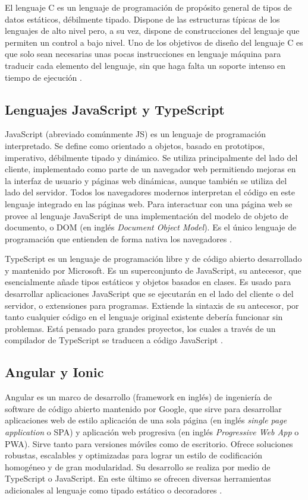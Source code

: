 El lenguaje C es un lenguaje de programación de propósito general de tipos de datos estáticos, débilmente tipado. Dispone de las estructuras típicas de los lenguajes de alto nivel pero, a su vez, dispone de construcciones del lenguaje que permiten un control a bajo nivel. Uno de los objetivos de diseño del lenguaje C es que solo sean necesarias unas pocas instrucciones en lenguaje máquina para traducir cada elemento del lenguaje, sin que haga falta un soporte intenso en tiempo de ejecución \citep{22}.

\subsection{Lenguajes JavaScript y TypeScript}

JavaScript (abreviado comúnmente JS) es un lenguaje de programación interpretado. Se define como orientado a objetos, basado en prototipos, imperativo, débilmente tipado y dinámico. Se utiliza principalmente del lado del cliente, implementado como parte de un navegador web permitiendo mejoras en la interfaz de usuario y páginas web dinámicas, aunque también se utiliza del lado del servidor. Todos los navegadores modernos interpretan el código en este lenguaje integrado en las páginas web. Para interactuar con una página web se provee al lenguaje JavaScript de una implementación del modelo de objeto de documento, o DOM (en inglés \textit{Document Object Model}). Es el único lenguaje de programación que entienden de forma nativa los navegadores \citep{23}.

TypeScript es un lenguaje de programación libre y de código abierto desarrollado y mantenido por Microsoft. Es un superconjunto de JavaScript, su antecesor, que esencialmente añade tipos estáticos y objetos basados en clases. Es usado para desarrollar aplicaciones JavaScript que se ejecutarán en el lado del cliente o del servidor, o extensiones para programas. Extiende la sintaxis de su antecesor, por tanto cualquier código en el lenguaje original existente debería funcionar sin problemas. Está pensado para grandes proyectos, los cuales a través de un compilador de TypeScript se traducen a código JavaScript \citep{24}.

\subsection{Angular y Ionic}

Angular es un marco de desarrollo (framework en inglés) de ingeniería de software de código abierto mantenido por Google, que sirve para desarrollar aplicaciones web de estilo aplicación de una sola página (en inglés \textit{single page application} o SPA) y aplicación web progresiva (en inglés \textit{Progressive Web App} o PWA). Sirve tanto para versiones móviles como de escritorio. Ofrece soluciones robustas, escalables y optimizadas para lograr un estilo de codificación homogéneo y de gran modularidad. Su desarrollo se realiza por medio de TypeScript o JavaScript. En este último se ofrecen diversas herramientas adicionales al lenguaje como tipado estático o decoradores \citep{25}.

